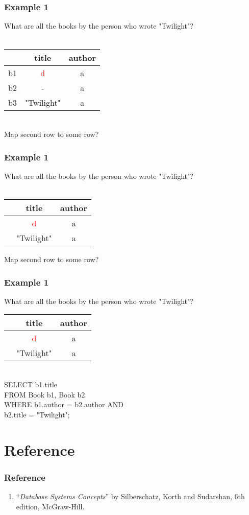 \documentclass{beamer}
\begin{document}
\begin{frame}
  \frametitle{Example 1}
  What are all the books by the person who wrote "Twilight"?\\
  \hfill \\
  \begin{tabular}{ c | c c }
  & title & author \\
  \hline
   b1 & \textcolor{red}{d} & a \\
   b2 & -         & a \\
   b3 & "Twilight" & a \\
  \end{tabular}
  \hfill \\
  Map second row to some row?
\end{frame}

\begin{frame}
  \frametitle{Example 1}
  What are all the books by the person who wrote "Twilight"?\\
  \hfill \\
  \begin{tabular}{ c | c c }
  & title & author \\
  \hline
   & \textcolor{red}{d} & a \\
   & "Twilight" & a \\
  \end{tabular}
  Map second row to some row?
\end{frame}

\begin{frame}
  \frametitle{Example 1}
  What are all the books by the person who wrote "Twilight"?\\
  \begin{tabular}{ c | c c }
  & title & author \\
  \hline
   & \textcolor{red}{d} & a \\
   & "Twilight" & a \\
  \end{tabular}
  \hfill \\
  SELECT b1.title\\
  FROM Book b1, Book b2\\
  WHERE b1.author = b2.author AND\\
        b2.title = "Twilight";\\
\end{frame}

\section{Reference}
\begin{frame}[fragile]
\frametitle{Reference}
\begin{enumerate}
\item ``\textit{Database Systems Concepts}'' by Silberschatz, Korth and Sudarshan, 6th edition, McGraw-Hill.
\end{enumerate}
\end{frame}
\end{document}
